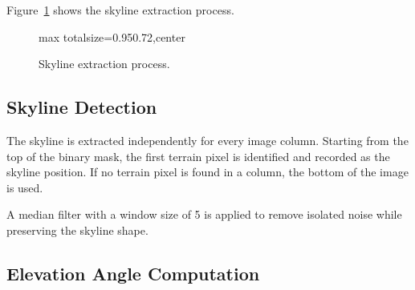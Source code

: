 Figure~\ref{fig:skyline_extraction_pipeline} shows the skyline extraction process.

\begin{figure}[H]
\centering
\begin{adjustbox}{max totalsize={0.95\textwidth}{0.72\textheight},center}
\end{adjustbox}
\caption{Skyline extraction process.}
\label{fig:skyline_extraction_pipeline}
\end{figure}

\subsection{Skyline Detection}

The skyline is extracted independently for every image column. Starting from the top of the binary mask, the first terrain pixel is identified and recorded as the skyline position. If no terrain pixel is found in a column, the bottom of the image is used.

A median filter with a window size of 5 is applied to remove isolated noise while preserving the skyline shape.

\subsection{Elevation Angle Computation}
\label{sec:elevation_computation}

